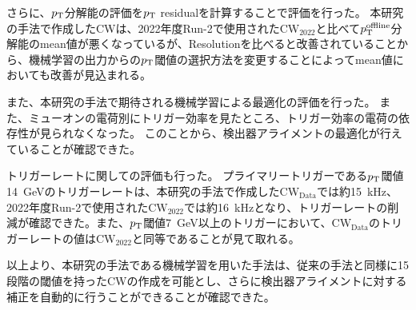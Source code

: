 さらに、$p_{\rm{T}}$分解能の評価を$p_{\rm{T}}$ residualを計算することで評価を行った。
本研究の手法で作成したCWは、2022年度Run-2で使用された$\mathrm{CW_{2022}}$と比べて$p_{\rm{T}}^{\rm{offline}}$分解能のmean値が悪くなっているが、Resolutionを比べると改善されていることから、機械学習の出力からの$p_{\rm{T}}$閾値の選択方法を変更することによってmean値においても改善が見込まれる。

また、本研究の手法で期待される機械学習による最適化の評価を行った。
また、ミューオンの電荷別にトリガー効率を見たところ、トリガー効率の電荷の依存性が見られなくなった。
このことから、検出器アライメントの最適化が行えていることが確認できた。

トリガーレートに関しての評価も行った。
プライマリートリガーである$p_{\rm{T}}$閾値14~GeVのトリガーレートは、本研究の手法で作成した$\mathrm{CW_{Data}}$では約15~kHz、2022年度Run-2で使用された$\mathrm{CW_{2022}}$では約16~kHzとなり、トリガーレートの削減が確認できた。また、$p_{\rm{T}}$閾値7~GeV以上のトリガーにおいて、$\mathrm{CW_{Data}}$のトリガーレートの値は$\mathrm{CW_{2022}}$と同等であることが見て取れる。

以上より、本研究の手法である機械学習を用いた手法は、従来の手法と同様に15段階の閾値を持ったCWの作成を可能とし、さらに検出器アライメントに対する補正を自動的に行うことができることが確認できた。






